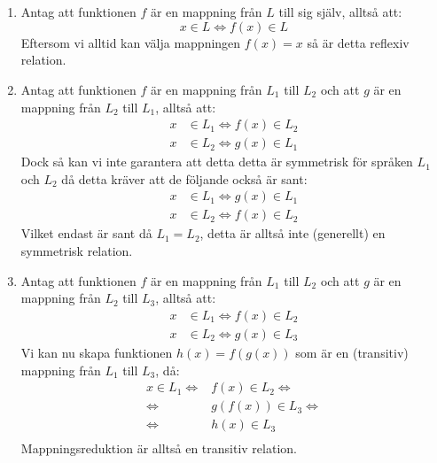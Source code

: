 \documentclass{article}
\begin{document}
\section{}

\begin{enumerate}[label=(\alph*)]
    \item
        Antag att funktionen $f$ är en mappning från $L$ till sig själv, alltså att:
        $$x \in L \iff f(x) \in L$$
        Eftersom vi alltid kan välja mappningen $f(x)=x$ så är detta reflexiv relation.
    
    \item 
        Antag att funktionen $f$ är en mappning från $L_1$ till $L_2$ och att $g$ är en mappning från $L_2$ till $L_1$, alltså att: 
         \begin{align*}
            x & \in L_1 \iff f(x) \in L_2 \\
            x & \in L_2 \iff g(x) \in L_1
        \end{align*}
        Dock så kan vi inte garantera att detta detta är symmetrisk för språken $L_1$ och $L_2$ då detta kräver att de följande också är sant:
        \begin{align*}
            x & \in L_1 \iff g(x) \in L_1 \\
            x & \in L_2 \iff f(x) \in L_2
        \end{align*}
        Vilket endast är sant då $L_1 = L_2$, detta är alltså inte (generellt) en  symmetrisk relation.
        
    \item 
        Antag att funktionen $f$ är en mappning från $L_1$ till $L_2$ och att $g$ är en mappning från $L_2$ till $L_3$, alltså att:
        \begin{align*}
            x & \in L_1 \iff f(x) \in L_2 \\
            x & \in L_2 \iff g(x) \in L_3
        \end{align*}
        Vi kan nu skapa funktionen $h(x) = f(g(x))$ som är en (transitiv) mappning från $L_1$ till $L_3$, då:
        \begin{align*}
            x \in L_1 \iff &f(x) \in L_2 \iff \\
            \iff &g(f(x)) \in L_3 \iff \\ 
            \iff &h(x) \in L_3 \\
        \end{align*}
        Mappningsreduktion är alltså en transitiv relation.
        
        


\end{enumerate}
\end{document}
